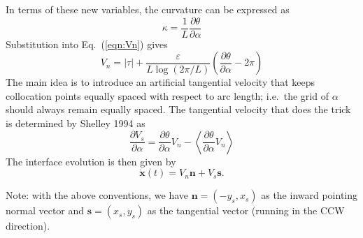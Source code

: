 \documentclass[11pt]{article}
\newcommand{\abs}[1]{\left| #1 \right|}
\newcommand{\mean}[1]{\left< #1 \right>}
\newcommand{\eps}{\varepsilon}
\newcommand{\atau}{\abs{\tau}}
\newcommand{\xx}{{\mathbf{x}}}
\renewcommand{\ss}{{\mathbf{s}}}
\newcommand{\nn}{{\mathbf{n}}}
\newcommand{\pderiv}[2]{\frac{\partial #1}{\partial #2}}
\newcommand{\Vn}{V_n}
\newcommand{\Vs}{V_s}
\newcommand{\thalpha}{\pderiv{\theta}{\alpha}}
\begin{document}
In terms of these new variables, the curvature can be expressed as
\begin{equation}
\kappa = \frac{1}{L} \pderiv{\theta}{\alpha}
\end{equation}
Substitution into Eq.~(\ref{eqn:Vn}) gives
\begin{equation}
\label{eqn:Vn2}
\Vn = \atau + \frac{\eps}{L \log \left(2\pi/L \right)}  \left(\pderiv{\theta}{\alpha} - 2 \pi \right)
\end{equation}
The main idea is to introduce an artificial tangential velocity that keeps collocation points equally spaced with respect to arc length; i.e.~the grid of $\alpha$ should always remain equally spaced. The tangential velocity that does the trick is determined by Shelley 1994 as
\begin{equation}
\pderiv{\Vs}{\alpha} = \thalpha \Vn - \mean{\thalpha \Vn}
\end{equation}
The interface evolution is then given by
\begin{equation}
\dot{\xx}(t) = \Vn \nn + \Vs \ss.
\end{equation}

Note: with the above conventions, we have $\nn = (-y_s, x_s)$ as the inward pointing normal vector and $\ss = (x_s, y_s)$ as the tangential vector (running in the CCW direction). 
\end{document}
